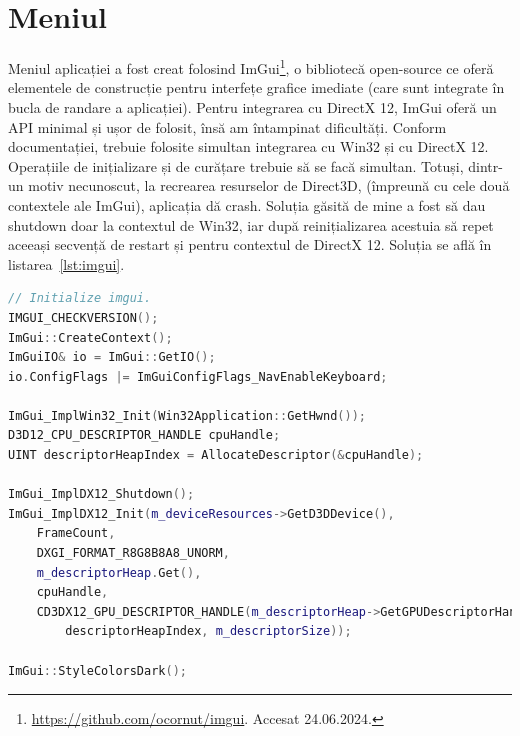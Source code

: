 \documentclass[12pt,a4paper]{report}
\numberwithin{equation}{section} %
\begin{document}
\section{Meniul}
Meniul aplicației a fost creat folosind ImGui\footnote{\label{fn:imgui}\url{https://github.com/ocornut/imgui}. Accesat 24.06.2024.}, o bibliotecă open-source ce oferă
elementele de construcție pentru interfețe grafice imediate (care sunt integrate
în bucla de randare a aplicației). Pentru integrarea cu DirectX 12, ImGui oferă
un API minimal și ușor de folosit, însă am întampinat dificultăți. Conform documentației,
trebuie folosite simultan integrarea cu Win32 și cu DirectX 12. Operațiile de inițializare
și de curățare trebuie să se facă simultan. Totuși, dintr-un motiv necunoscut,
la recrearea resurselor de Direct3D, (împreună cu cele două contextele ale ImGui),
aplicația dă crash. Soluția găsită de mine a fost să dau shutdown doar la contextul
de Win32, iar după reinițializarea acestuia să repet aceeași secvență de restart
și pentru contextul de DirectX 12. Soluția se află în listarea~\ref{lst:imgui}.
\begin{lstlisting}[caption={Reinițializare ImGui. Bazat pe documentația oficială\protect\footref{fn:imgui}},label={lst:imgui},language=C++]
// Initialize imgui.
IMGUI_CHECKVERSION();
ImGui::CreateContext();
ImGuiIO& io = ImGui::GetIO();
io.ConfigFlags |= ImGuiConfigFlags_NavEnableKeyboard;

ImGui_ImplWin32_Init(Win32Application::GetHwnd());
D3D12_CPU_DESCRIPTOR_HANDLE cpuHandle;
UINT descriptorHeapIndex = AllocateDescriptor(&cpuHandle);

ImGui_ImplDX12_Shutdown();
ImGui_ImplDX12_Init(m_deviceResources->GetD3DDevice(),
	FrameCount,
	DXGI_FORMAT_R8G8B8A8_UNORM,
	m_descriptorHeap.Get(),
	cpuHandle,
	CD3DX12_GPU_DESCRIPTOR_HANDLE(m_descriptorHeap->GetGPUDescriptorHandleForHeapStart(),
		descriptorHeapIndex, m_descriptorSize));

ImGui::StyleColorsDark();
\end{lstlisting}
\end{document}
